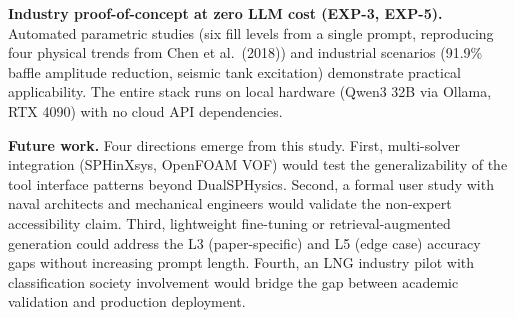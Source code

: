 \documentclass[11pt]{article}
\begin{document}
\textbf{Industry proof-of-concept at zero LLM cost (EXP-3, EXP-5).} Automated parametric studies (six fill levels from a single prompt, reproducing four physical trends from Chen et al.\ (2018)) and industrial scenarios (91.9\% baffle amplitude reduction, seismic tank excitation) demonstrate practical applicability. The entire stack runs on local hardware (Qwen3 32B via Ollama, RTX 4090) with no cloud API dependencies.

\textbf{Future work.} Four directions emerge from this study. First, multi-solver integration (SPHinXsys, OpenFOAM VOF) would test the generalizability of the tool interface patterns beyond DualSPHysics. Second, a formal user study with naval architects and mechanical engineers would validate the non-expert accessibility claim. Third, lightweight fine-tuning or retrieval-augmented generation could address the L3 (paper-specific) and L5 (edge case) accuracy gaps without increasing prompt length. Fourth, an LNG industry pilot with classification society involvement would bridge the gap between academic validation and production deployment.



\end{document}
